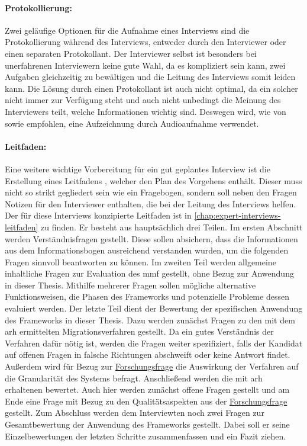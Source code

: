 \paragraph{Protokollierung:} Zwei geläufige Optionen für die Aufnahme eines Interviews sind die Protokollierung während des Interviews, entweder durch den Interviewer oder einen separaten Protokollant.
Der Interviewer selbst ist besonders bei unerfahrenen Interviewern keine gute Wahl, da es kompliziert sein kann, zwei Aufgaben gleichzeitig zu bewältigen und die Leitung des Interviews somit leiden kann.
Die Lösung durch einen Protokollant ist auch nicht optimal, da ein solcher nicht immer zur Verfügung steht und auch nicht unbedingt die Meinung des Interviewers teilt, welche Informationen wichtig sind.
Deswegen wird, wie von  sowie  empfohlen, eine Aufzeichnung durch Audioaufnahme verwendet.

\paragraph{Leitfaden:} Eine weitere wichtige Vorbereitung für ein gut geplantes Interview ist die Erstellung eines Leitfadens \cite{seaman2008qualitative,hove-anda-2005}, welcher den Plan des Vorgehens enthält.
Dieser muss nicht so strikt gegliedert sein wie ein Fragebogen, sondern soll neben den Fragen Notizen für den Interviewer enthalten, die bei der Leitung des Interviews helfen.
Der für diese Interviews konzipierte Leitfaden ist in \cref{chap:expert-interviews-leitfaden} zu finden.
Er besteht aus hauptsächlich drei Teilen.
Im ersten Abschnitt werden Verständnisfragen gestellt.
Diese sollen absichern, dass die Informationen aus dem Informationsbogen ausreichend verstanden wurden, um die folgenden Fragen sinnvoll beantworten zu können.
Im zweiten Teil werden allgemeine inhaltliche Fragen zur Evaluation des \gls{mmf} gestellt, ohne Bezug zur Anwendung in dieser Thesis. 
Mithilfe mehrerer Fragen sollen mögliche alternative Funktionsweisen, die Phasen des Frameworks und potenzielle Probleme dessen evaluiert werden.
Der letzte Teil dient der Bewertung der spezifischen Anwendung des Frameworks in dieser Thesis.
Dazu werden zunächst Fragen zu den mit dem \gls{arh} ermittelten Migrationsverfahren gestellt.
Da ein gutes Verständnis der Verfahren dafür nötig ist, werden die Fragen weiter spezifiziert, falls der Kandidat auf offenen Fragen in falsche Richtungen abschweift oder keine Antwort findet.
Außerdem wird für Bezug zur \hyperref[forschungsfrage:1]{Forschungsfrage} die Auswirkung der Verfahren auf die Granularität des Systems befragt.
Anschließend werden die mit \gls{arh} erhaltenen \bpp bewertet.
Auch hier werden zunächst offene Fragen gestellt und am Ende eine Frage mit Bezug zu den Qualitätsaspekten aus der \hyperref[forschungsfrage:1]{Forschungsfrage} gestellt.
Zum Abschluss werden dem Interviewten noch zwei Fragen zur Gesamtbewertung der Anwendung des Frameworks gestellt. 
Dabei soll er seine Einzelbewertungen der letzten Schritte zusammenfassen und ein Fazit ziehen.

